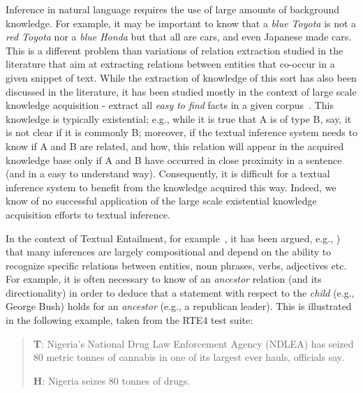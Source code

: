 \newcommand{\ignore}[1]{}

Inference in natural language requires the use of large amounts
of background knowledge. For example, it may be important to
know that a {\em blue Toyota} is not a {\em red Toyota} nor a
{\em blue Honda} but that all are cars, and even Japanese made
cars. This is a different problem than variations of relation
extraction studied in the literature that aim at extracting
relations between entities that co-occur in a given snippet of
text. While the extraction of knowledge of this sort has also
been discussed in the literature, it has been studied mostly in
the context of large scale knowledge acquisition - extract all
{\em easy to find} facts in a given
corpus~\cite{banko-etzioni:2008:ACLMain,davidov-rappoport:2008:ACLMain2,pacsca-vandurme:2008:ACLMain,bunescu-mooney:2007:ACLMain}.
This knowledge is typically existential; e.g., while it is true
that A is of type B, say, it is not clear if it is commonly B;
moreover, if the textual inference system needs to know if A
and B are related, and how, this relation will appear in the
acquired knowledge base only if A and B have occurred in close
proximity in a sentence (and in a easy to understand way).
Consequently, it is difficult for a textual inference system to
benefit from the knowledge acquired this way. Indeed, we know
of no successful application of the large scale existential
knowledge acquisition efforts to textual inference.

In the context of Textual Entailment, for
example~\cite{DaganGlMa06,HaghighiNMa05,BGPRS05}, it has been
argued, e.g., \cite{maccartney-manning:2008:PAPERS}) that many
inferences are largely compositional and depend on the ability
to recognize specific  relations between entities, noun
phrases, verbs, adjectives etc. For example, it is often
necessary to know of an {\em ancestor} relation (and its
directionality) in order to deduce that a statement with
respect to the {\em child} (e.g., George Bush) holds for an {\em ancestor}
(e.g., a republican leader). This is illustrated in the
following example, taken from the RTE4 test suite:

{\small
\begin{quote}

{\bf T}: Nigeria's National Drug Law Enforcement Agency (NDLEA)
has seized 80 metric tonnes of cannabis in one of its largest
ever hauls, officials say.

{\bf H}: Nigeria seizes 80 tonnes of drugs.
\end{quote}
}

